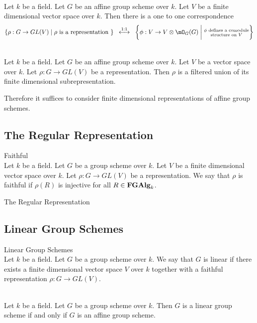 \documentclass[a4paper]{article}
\begin{document}
\begin{prp}{}{}\\
Let $k$ be a field. Let $G$ be an affine group scheme over $k$. Let $V$ be a finite dimensional vector space over $k$. Then there is a one to one correspondence $$\{\rho:G\to GL(V)\;|\;\rho\text{ is a representation }\}\;\;\overset{1:1}{\longleftrightarrow}\;\;\left\{\phi:V\to V\otimes\mO_G(G)\;\bigg{|}\;\substack{\phi\text{ defines a comodule}\\\text{structure on }V}\right\}$$
\end{prp}

\begin{prp}{}{}\\
Let $k$ be a field. Let $G$ be an affine group scheme over $k$. Let $V$ be a vector space over $k$. Let $\rho:G\to GL(V)$ be a representation. Then $\rho$ is a filtered union of its finite dimensional subrepresentation. 
\end{prp}

Therefore it suffices to consider finite dimensional representations of affine group schemes. 

\subsection{The Regular Representation}
\begin{defn}{Faithful}{}\\
Let $k$ be a field. Let $G$ be a group scheme over $k$. Let $V$ be a finite dimensional vector space over $k$. Let $\rho:G\to GL(V)$ be a representation. We say that $\rho$ is faithful if $\rho(R)$ is injective for all $R\in\bold{FGAlg}_k$. 
\end{defn}

\begin{defn}{The Regular Representation}{}
\end{defn}

\subsection{Linear Group Schemes}
\begin{defn}{Linear Group Schemes}{}\\
Let $k$ be a field. Let $G$ be a group scheme over $k$. We say that $G$ is linear if there exists a finite dimensional vector space $V$ over $k$ together with a faithful representation $\rho:G\to GL(V)$. 
\end{defn}

\begin{prp}{}{}\\
Let $k$ be a field. Let $G$ be a group scheme over $k$. Then $G$ is a linear group scheme if and only if $G$ is an affine group scheme. 
\end{prp}
\end{document}
